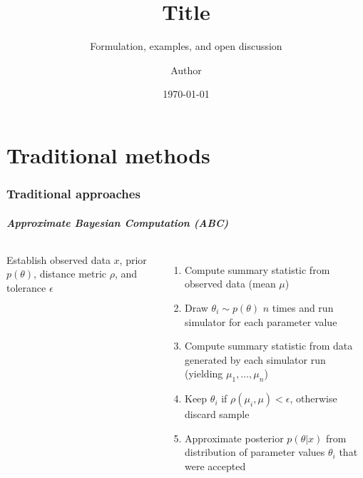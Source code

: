\documentclass[10pt,usenames,dvipsnames]{beamer}
\title{Title}
\subtitle{Formulation, examples, and open discussion}
\date{\today}
\author{Author}
\institute{Institution}
\begin{document}
  \maketitle

  \section{Traditional methods}
  \begin{frame}
    \frametitle{Traditional approaches}
    \framesubtitle{\textit{Approximate Bayesian Computation (ABC)}}

    \begin{columns}[c]
        \column{2.3in}
        Establish observed data $x$, prior $p(\theta)$, distance metric $\rho$, and tolerance $\epsilon$
        \vspace{0.05in}
        \begin{enumerate}
            \item Compute summary statistic from observed data (mean $\mu$)
            \item Draw $\theta_i \sim p(\theta)$ $n$ times and run simulator for each
                parameter value
            \item Compute summary statistic from data generated by each simulator run
                (yielding $\mu_1, \dots, \mu_n$)
            \item Keep $\theta_i$ if $\rho(\mu_i, \mu) < \epsilon$, otherwise
                discard sample
            \item Approximate posterior $p(\theta|x)$ from distribution of
                parameter values $\theta_i$ that were accepted
        \end{enumerate}
        \column{2.3in}
    \end{columns}
  \end{frame}
\end{document}
